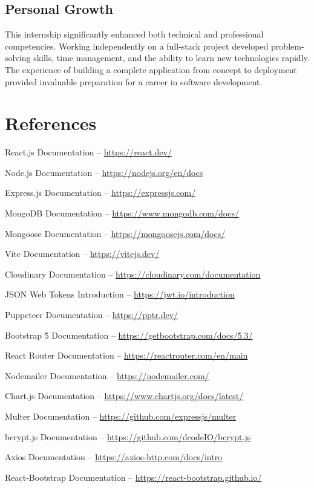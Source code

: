 \documentclass[12pt,a4paper]{report}
\begin{document}
\section{Personal Growth}
This internship significantly enhanced both technical and professional competencies. Working independently on a full-stack project developed problem-solving skills, time management, and the ability to learn new technologies rapidly. The experience of building a complete application from concept to deployment provided invaluable preparation for a career in software development.


\chapter{References}

\begin{enumerate}[label={[\arabic*]}]
    \item React.js Documentation -- \url{https://react.dev/}
    \item Node.js Documentation -- \url{https://nodejs.org/en/docs}
    \item Express.js Documentation -- \url{https://expressjs.com/}
    \item MongoDB Documentation -- \url{https://www.mongodb.com/docs/}
    \item Mongoose Documentation -- \url{https://mongoosejs.com/docs/}
    \item Vite Documentation -- \url{https://vitejs.dev/}
    \item Cloudinary Documentation -- \url{https://cloudinary.com/documentation}
    \item JSON Web Tokens Introduction -- \url{https://jwt.io/introduction}
    \item Puppeteer Documentation -- \url{https://pptr.dev/}
    \item Bootstrap 5 Documentation -- \url{https://getbootstrap.com/docs/5.3/}
    \item React Router Documentation -- \url{https://reactrouter.com/en/main}
    \item Nodemailer Documentation -- \url{https://nodemailer.com/}
    \item Chart.js Documentation -- \url{https://www.chartjs.org/docs/latest/}
    \item Multer Documentation -- \url{https://github.com/expressjs/multer}
    \item bcrypt.js Documentation -- \url{https://github.com/dcodeIO/bcrypt.js}
    \item Axios Documentation -- \url{https://axios-http.com/docs/intro}
    \item React-Bootstrap Documentation -- \url{https://react-bootstrap.github.io/}
\end{enumerate}
\end{document}
